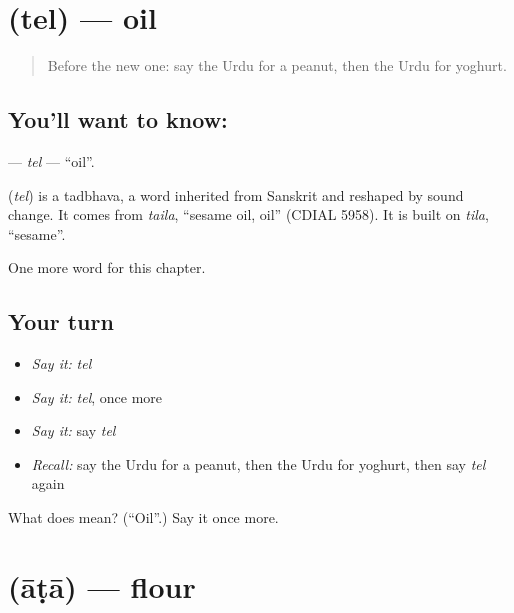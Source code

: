 \section[\texorpdfstring{\ur{تیل} (tel)}{تیل (tel)}]{ (tel) — oil}

\label{lesson:UR-C117-tel}



\begin{quote}
Before the new one: say the Urdu for a peanut, then the Urdu for yoghurt.
\end{quote}

\subsection*{You'll want to know: }
\textbf{} — \emph{tel} — \textquotedblleft{}oil\textquotedblright{}.

\begin{cousinweb}
\textbf{} (\emph{tel}) is a tadbhava, a word inherited from Sanskrit and reshaped by sound change. It comes from \emph{taila}, \textquotedblleft{}sesame oil, oil\textquotedblright{} (CDIAL 5958). It is built on \emph{tila}, \textquotedblleft{}sesame\textquotedblright{}.
\end{cousinweb}

\begin{grammarlens}[title={What you've built}]
One more word for this chapter.
\end{grammarlens}

\subsection*{Your turn}
\begin{itemize}
\raggedright
  \item \emph{Say it:} \emph{tel}
  \item \emph{Say it:} \emph{tel}, once more
  \item \emph{Say it:} say \emph{tel}
  \item \emph{Recall:} say the Urdu for a peanut, then the Urdu for yoghurt, then say \emph{tel} again
\end{itemize}

\begin{tcolorbox}[breakable,colback=teal!4,colframe=teal!35!black,title={Before you move on}]
What does  mean? (\textquotedblleft{}Oil\textquotedblright{}.) Say it once more.
\end{tcolorbox}
\section[\texorpdfstring{\ur{آٹا} (āṭā)}{آٹا (āṭā)}]{ (āṭā) — flour}

